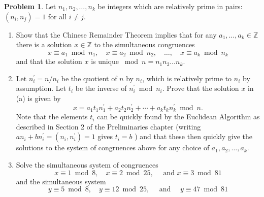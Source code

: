 \documentclass{amsart}
\numberwithin{equation}{section}
\theoremstyle{definition}
\newtheorem{problem}[thm]{Problem}
\begin{document}
\begin{problem}
Let \(n_1, n_2, \ldots, n_k\) be integers which are relatively prime in pairs: \(\left(n_i, n_j\right)=1\) for all \(i \neq j\).
\begin{enumerate}
\item Show that the Chinese Remainder Theorem implies that for any \(a_1, \ldots, a_k \in \mathbb{Z}\) there is a solution \(x \in \mathbb{Z}\) to the simultaneous congruences
\[
x \equiv a_1 \bmod n_1, \quad x \equiv a_2 \bmod n_2, \quad \ldots, \quad x \equiv a_k \bmod n_k
\]
and that the solution \(x\) is unique \(\bmod n = n_1 n_2 \ldots n_k\).
\item Let \(n_i^{\prime}=n / n_i\) be the quotient of \(n\) by \(n_i\), which is relatively prime to \(n_i\) by assumption. Let \(t_i\) be the inverse of \(n_i^{\prime} \bmod n_i\). Prove that the solution \(x\) in (a) is given by
\[
x=a_1 t_1 n_1^{\prime}+a_2 t_2 n_2^{\prime}+\cdots+a_k t_k n_k^{\prime} \bmod n .
\]
Note that the elements \(t_i\) can be quickly found by the Euclidean Algorithm as described in Section 2 of the Preliminaries chapter (writing \(a n_i+b n_i^{\prime}=\left(n_i, n_i^{\prime}\right)=1\) gives \(t_i=b\) ) and that these then quickly give the solutions to the system of congruences above for any choice of \(a_1, a_2, \ldots, a_k\).

\item Solve the simultaneous system of congruences
\[
x \equiv 1 \bmod 8, \quad x \equiv 2 \bmod 25, \quad \text { and } x \equiv 3 \bmod 81
\]
and the simultaneous system
\[
y \equiv 5 \bmod 8, \quad y \equiv 12 \bmod 25, \quad \text { and } \quad y \equiv 47 \bmod 81
\]
\end{enumerate}
\end{problem}
\end{document}

